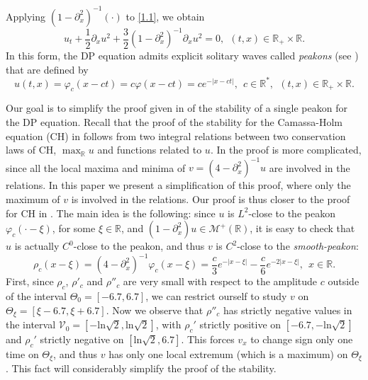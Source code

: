 \documentclass[10pt,a4paper,twoside]{article}
\begin{document}
Applying $(1-\partial^{2}_{x})^{-1}(\cdot)$ to \eqref{1.1}, we obtain
\begin{equation}\label{int1}
u_{t}+\frac{1}{2}\partial_{x} u^{2}+\frac{3}{2}(1-\partial^{2}_{x})^{-1}\partial_{x}u^{2}=0,
~~(t,x)\in\mathbb{R}_{+}\times\mathbb{R}.
\end{equation}
In this form, the DP equation admits explicit solitary waves called \textit{peakons} (see \cite{MR2001531}) that are defined by
\begin{equation}
u(t,x)=\varphi_{c}(x-ct)=c\varphi(x-ct)
=ce^{-|x-ct|},
~~c\in\mathbb{R}^{*},
~~(t,x)\in\mathbb{R}_{+}\times\mathbb{R}.
\label{1.7}
\end{equation}


Our goal is to simplify the proof given in \cite{MR2460268} of the stability of a single peakon for the DP equation. Recall that the proof of the stability for the Camassa-Holm equation (CH) in \cite{MR1737505} follows from two integral relations between two conservation laws of CH, $\max_{\mathbb{R}} u$ and functions related to $u$. In \cite{MR2460268} the proof is more complicated, since all the local maxima and minima of $v=(4-\partial^{2}_{x})^{-1}u$ are involved in the relations. In this paper we present a simplification of this proof, where only the maximum of $v$ is involved in the relations. Our proof is thus closer to the proof for CH in \cite{MR1737505}. The main idea is the following: since $u$ is $L^{2}$-close to the peakon $\varphi_{c}(\cdot-\xi)$, for some $\xi\in\mathbb{R}$, and $(1-\partial^{2}_{x})u\in\mathcal{M}^{+}(\mathbb{R})$, it is easy to check that $u$ is actually $C^{0}$-close to the peakon, and thus $v$ is $C^{2}$-close to the \textit{smooth-peakon}:
\begin{equation}\label{smooth1}
\rho_{c}(x-\xi)=(4-\partial^{2}_{x})^{-1}\varphi_{c}(x-\xi)
=\frac{c}{3}e^{-|x-\xi|}-\frac{c}{6}e^{-2|x-\xi|},
~~x\in\mathbb{R}.
\end{equation}
First, since $\rho_{c}$, $\rho'_{c}$ and $\rho''_{c}$ are very small with respect to the amplitude $c$ outside of the interval 
$\Theta_0=[-6.7,6.7]$, we can restrict ourself to study $v$ on $\Theta_\xi = [\xi-6.7,\xi+6.7]$. Now we observe that $\rho''_{c}$ has strictly negative values in the interval $\mathcal{V}_0=[-\text{ln}\sqrt{2},\text{ln}\sqrt{2}]$, with $\rho_c'$ strictly positive on $[-6.7,-\text{ln}\sqrt{2}]$ and $\rho_c' $ strictly negative on 
$[\text{ln}\sqrt{2},6.7]$. This forces $v_{x}$ to change sign only one time on $\Theta_\xi $, and thus $v$ has only one local extremum (which is a maximum) on $\Theta_\xi$. This fact will considerably simplify the proof of the stability. 
\end{document}
